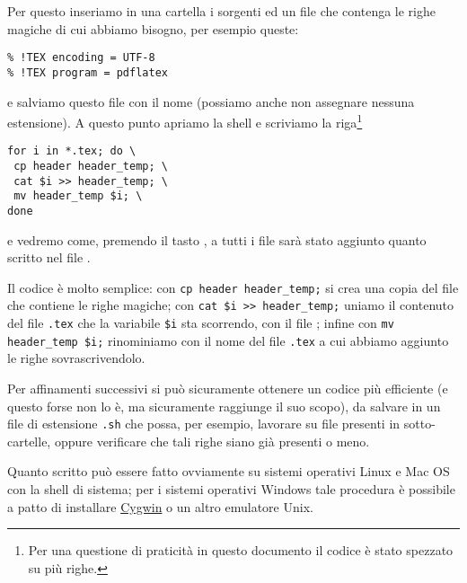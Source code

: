 Per questo inseriamo in una cartella i sorgenti ed un file che contenga le righe magiche di cui abbiamo bisogno, per esempio queste:
\begin{Verbatim}
% !TEX encoding = UTF-8
% !TEX program = pdflatex
\end{Verbatim}
e salviamo questo file con il nome  (possiamo anche non assegnare nessuna estensione). A questo punto apriamo la shell e scriviamo la riga\footnote{Per una questione di praticità in questo documento il codice è stato spezzato su più righe.}
\begin{Verbatim}
for i in *.tex; do \
 cp header header_temp; \
 cat $i >> header_temp; \
 mv header_temp $i; \
done
\end{Verbatim}
e vedremo come, premendo il tasto \keys{\return}, a tutti i file sarà stato aggiunto quanto scritto nel file . 

Il codice è molto semplice: con \verb!cp header header_temp;! si crea una copia del file che contiene le righe magiche; con \verb!cat $i >> header_temp;! uniamo il contenuto del file \texttt{.tex} che la variabile \verb!$i! sta scorrendo, con il file ; infine con \verb!mv header_temp $i;! rinominiamo  con il nome del file \texttt{.tex} a cui abbiamo aggiunto le righe sovrascrivendolo.

Per affinamenti successivi si può sicuramente ottenere un codice più efficiente (e questo forse non lo è, ma sicuramente raggiunge il suo scopo), da salvare in un file di estensione \texttt{.sh} che possa, per esempio, lavorare su file presenti in sotto-cartelle, oppure verificare che tali righe siano già presenti o meno. 

Quanto scritto può essere fatto ovviamente su sistemi operativi Linux e Mac OS con la shell di sistema; per i sistemi operativi Windows tale procedura è possibile a patto di installare \href{http://www.cygwin.com/}{Cygwin} o un altro emulatore Unix.


\endinput

\section{Creazione di cartelle ramificate}
\section{Aprire il terminale da una cartella}
\section{Redirezione dei dati}
\section{Operare con i diritti di root}
\section{Scripting}




